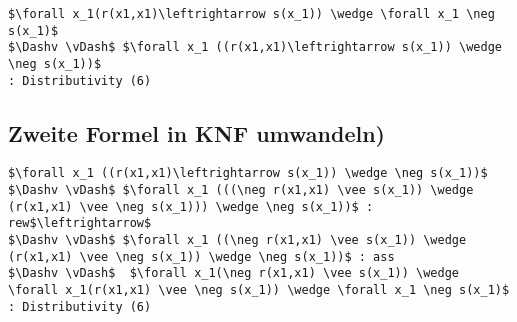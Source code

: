 \begin{lstlisting}
$\forall x_1(r(x1,x1)\leftrightarrow s(x_1)) \wedge \forall x_1 \neg s(x_1)$
$\Dashv \vDash$ $\forall x_1 ((r(x1,x1)\leftrightarrow s(x_1)) \wedge \neg s(x_1))$
: Distributivity (6)
\end{lstlisting}

\subsection*{Zweite Formel in KNF umwandeln)}

\begin{lstlisting}
$\forall x_1 ((r(x1,x1)\leftrightarrow s(x_1)) \wedge \neg s(x_1))$
$\Dashv \vDash$ $\forall x_1 (((\neg r(x1,x1) \vee s(x_1)) \wedge (r(x1,x1) \vee \neg s(x_1))) \wedge \neg s(x_1))$ : rew$\leftrightarrow$
$\Dashv \vDash$ $\forall x_1 ((\neg r(x1,x1) \vee s(x_1)) \wedge (r(x1,x1) \vee \neg s(x_1)) \wedge \neg s(x_1))$ : ass 
$\Dashv \vDash$  $\forall x_1(\neg r(x1,x1) \vee s(x_1)) \wedge \forall x_1(r(x1,x1) \vee \neg s(x_1)) \wedge \forall x_1 \neg s(x_1)$
: Distributivity (6)

\end{lstlisting}